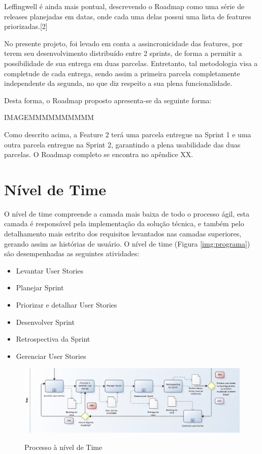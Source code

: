Leffingwell é ainda mais pontual, descrevendo o Roadmap como uma série de releases planejadas em datas, onde cada uma delas possui uma lista de features priorizadas.[2]

No presente projeto, foi levado em conta a assincronicidade das features, por terem seu desenvolvimento distribuído entre 2 sprints, de forma a permitir a possibilidade de sua entrega em duas parcelas. Entretanto, tal metodologia visa a completude de cada entrega, sendo assim a primeira parcela completamente independente da segunda, no que diz respeito a sua plena funcionalidade.

Desta forma, o Roadmap proposto apresenta-se da seguinte forma:

IMAGEMMMMMMMMMM

Como descrito acima, a Feature 2 terá uma parcela entregue na Sprint 1 e uma outra parcela entregue na Sprint 2, garantindo a plena usabilidade das duas parcelas.
O Roadmap completo se encontra no apêndice XX.

\section{Nível de Time}

O nível de time compreende a camada mais baixa de todo o processo ágil, esta camada é responsável pela implementação da solução técnica, e também pelo detalhamento mais estrito dos requisitos levantados nas camadas superiores, gerando assim as histórias de usuário. O nível de time (Figura \ref{img:programa}) são desempenhadas as seguintes atividades:

\begin{itemize}
\item Levantar User Stories
\item Planejar Sprint
\item Priorizar e detalhar User Stories
\item Desenvolver Sprint
\item Retrospectiva da Sprint
\item Gerenciar User Stories
\end{itemize}

\FloatBarrier
\begin{figure}[!htpd]
		\centering
		\includegraphics[scale=0.4]{figuras/time}
		\label{img:time}
		\caption{Processo à nível de Time}
\end{figure}


